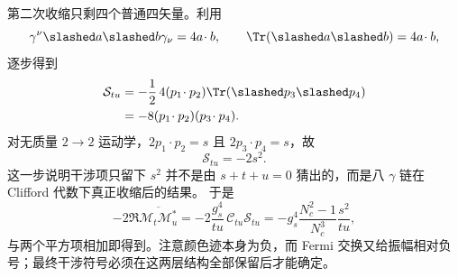 \begin{derivation}
第二次收缩只剩四个普通四矢量。利用
\begin{equation*}
\gamma^\nu\slashed a\slashed b\gamma_\nu=4a\!\cdot b,
\qquad
\Tr(\slashed a\slashed b)=4a\!\cdot b,
\end{equation*}
逐步得到
\begin{align*}
\mathcal S_{tu}
&=-\frac12\,4(p_1\!\cdot p_2)\Tr(\slashed p_3\slashed p_4)\\
&=-8(p_1\!\cdot p_2)(p_3\!\cdot p_4).
\end{align*}
对无质量 $2\to2$ 运动学，$2p_1\!\cdot p_2=s$ 且 $2p_3\!\cdot p_4=s$，故
\begin{equation*}
\boxed{\mathcal S_{tu}=-2s^2.}
\end{equation*}
这一步说明干涉项只留下 $s^2$ 并不是由 $s+t+u=0$ 猜出的，而是八 $\gamma$ 链在 Clifford 代数下真正收缩后的结果。
于是
\begin{equation*}
-2\Re\overline{\mathcal M_t\mathcal M_u^*}
=-2\frac{g_s^4}{tu}\,\mathcal C_{tu}\mathcal S_{tu}
=-g_s^4\frac{N_c^2-1}{N_c^3}\frac{s^2}{tu},
\end{equation*}
与两个平方项相加即得到。注意颜色迹本身为负，而 Fermi 交换又给振幅相对负号；最终干涉符号必须在这两层结构全部保留后才能确定。
\end{derivation}
